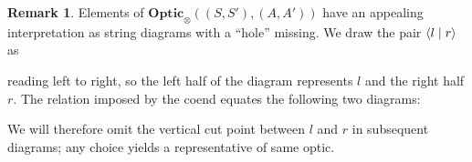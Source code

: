 \documentclass[11pt,a4paper]{article}
\theoremstyle{plain}
\theoremstyle{definition}
\newtheorem{remark}[theorem]{Remark}
\newcommand{\Optic}{\mathbf{Optic}}
\newcommand{\rep}[2]{{\ensuremath \left\langle #1 \mid #2 \right\rangle}}
\begin{document}
\begin{remark}
  Elements of $\Optic_\otimes((S, S'), (A, A'))$ have an appealing
  interpretation as string diagrams with a ``hole'' missing. We draw the
  pair $\rep{l}{r}$ as
  \begin{center}
    
  \end{center}
  reading left to right, so the left half of the diagram represents $l$ and the right half $r$. The relation imposed by the coend equates the following two diagrams:
  \begin{center}
    
    \qquad
    
  \end{center}
  We will therefore omit the vertical cut point between $l$ and $r$ in subsequent diagrams; any choice yields a representative of same optic.
\end{remark}
\end{document}
